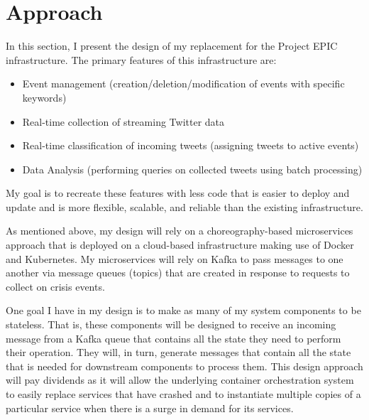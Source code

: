 
\chapter{Approach} %

\label{Chapter4} %

In this section, I present the design of my replacement for the Project EPIC infrastructure. The primary features of this infrastructure are:
\begin{itemize}
	\item Event management (creation/deletion/modification of events with specific keywords)
	\item Real-time collection of streaming Twitter data
	\item Real-time classification of incoming tweets (assigning tweets to active events)
	\item Data Analysis (performing queries on collected tweets using batch processing)
\end{itemize}

My goal is to recreate these features with less code that is easier to deploy and update and is more flexible, scalable, and reliable than the existing infrastructure.

As mentioned above, my design will rely on a choreography-based microservices approach that is deployed on a cloud-based infrastructure making use of Docker and Kubernetes. My microservices will rely on Kafka to pass messages to one another via message queues (topics) that are created in response to requests to collect on crisis events.

One goal I have in my design is to make as many of my system components to be stateless. That is, these components will be designed to receive an incoming message from a Kafka queue that contains all the state they need to perform their operation. They will, in turn, generate messages that contain all the state that is needed for downstream components to process them. This design approach will pay dividends as it will allow the underlying container orchestration system to easily replace services that have crashed and to instantiate multiple copies of a particular service when there is a surge in demand for its services.



